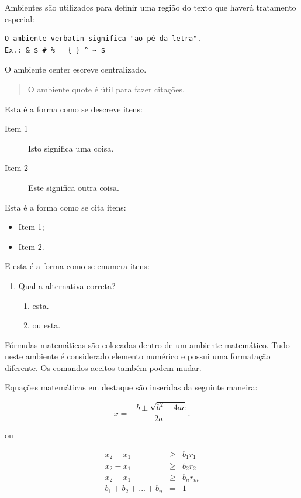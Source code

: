 Ambientes são utilizados para definir uma região do texto que haverá tratamento especial:

\begin{verbatim}
O ambiente verbatin significa "ao pé da letra". 
Ex.: & $ # % _ { } ^ ~ $
\end{verbatim}

\begin{center}
O ambiente center escreve centralizado.
\end{center}

\begin{quote}
O ambiente quote é útil para fazer citações.
\end{quote}

Esta é a forma como se descreve itens:
\begin{description}
\item[Item 1] Isto significa uma coisa.
\item[Item 2] Este significa outra coisa.
\end{description}

Esta é a forma como se cita itens:
\begin{itemize}
\item Item 1;
\item Item 2.
\end{itemize}

E esta é a forma como se enumera itens:
\begin{enumerate}
	\item Qual a alternativa correta?
		\begin{enumerate}
			\item esta.
			\item ou esta.
		\end{enumerate}
\end{enumerate}

Fórmulas matemáticas são colocadas dentro de um ambiente matemático. Tudo neste ambiente é considerado elemento numérico e possui uma formatação diferente. Os comandos aceitos também podem mudar.

Equações matemáticas em destaque são inseridas da seguinte maneira:

$$
x=\frac{-b\pm\sqrt{b^2-4ac}}{2a}.
$$

ou 

\begin{equation}
\begin{array}{rcl}
x_2 - x_1 &\geq& b_1 r_1\\
x_2 - x_1 &\geq& b_2 r_2\\
x_2 - x_1 &\geq& b_n r_m\\
b_1 + b_2 + ... + b_n &=& 1
\end{array}
\end{equation}

